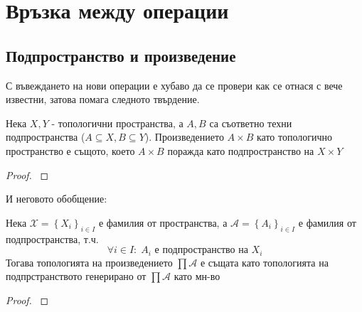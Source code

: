 \section{Връзка между операции}
\subsection{Подпространство и произведение}
С въвеждането на нови операции е хубаво да се провери как се отнася с вече известни, затова помага следното твърдение.
\begin{proposition}
    Нека $X, Y$ - топологични пространства, а $A, B$ са съответно техни подпространства ($A \subseteq X, B \subseteq Y$). Произведението $A \times B$ като топологично пространство е същото, което $A \times B$ поражда като подпространство на $X \times Y$
\end{proposition}
\begin{proof}
    \cite[p.~87]{munkrestopology}
\end{proof}
И неговото обобщение:
\begin{proposition}
    Нека $\mathcal X = \left\{X_i\right\}_{i\in I}$ е фамилия от пространства, а $\mathcal A = \left\{A_i\right\}_{i\in I}$ е фамилия от подпространства, т.ч.
    \begin{equation}
        \forall i \in I:\; A_i \text{ е подпространство на } X_i
    \end{equation}
    Тогава топологията на произведението $\prod \mathcal A$ е същата като топологията на подпрстранството генерирано от $\prod \mathcal A$ като мн-во
\end{proposition}
\begin{proof}
    \cite[p.~78]{engelking1989general}
\end{proof}

